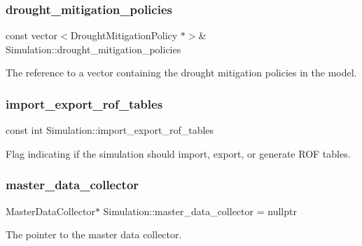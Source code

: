 \subsubsection{\texorpdfstring{drought\+\_\+mitigation\+\_\+policies}{drought\_mitigation\_policies}}
{\footnotesize\ttfamily const vector$<$Drought\+Mitigation\+Policy $\ast$$>$\& Simulation\+::drought\+\_\+mitigation\+\_\+policies\hspace{0.3cm}{\ttfamily [private]}}



The reference to a vector containing the drought mitigation policies in the model. 

\mbox{\label{classSimulation_a0989380cd166a60c2ba8bb2a1a9c138c}} 
\subsubsection{\texorpdfstring{import\+\_\+export\+\_\+rof\+\_\+tables}{import\_export\_rof\_tables}}
{\footnotesize\ttfamily const int Simulation\+::import\+\_\+export\+\_\+rof\+\_\+tables\hspace{0.3cm}{\ttfamily [private]}}



Flag indicating if the simulation should import, export, or generate R\+OF tables. 

\mbox{\label{classSimulation_a9c69464c2674176a43d1d48bee9fad50}} 
\subsubsection{\texorpdfstring{master\+\_\+data\+\_\+collector}{master\_data\_collector}}
{\footnotesize\ttfamily Master\+Data\+Collector$\ast$ Simulation\+::master\+\_\+data\+\_\+collector = nullptr\hspace{0.3cm}{\ttfamily [private]}}



The pointer to the master data collector. 

\mbox{\label{classSimulation_a91d4cbb85145e9ebb5a9cb5d24dace15}} 

